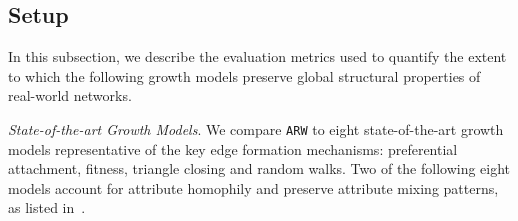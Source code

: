 \subsection{Setup}
\label{sub:Experimental Setup}

In this subsection, we describe the evaluation metrics used to quantify the extent to
which the following growth models preserve global structural properties of real-world networks.

\textit{State-of-the-art Growth Models}. We compare \texttt{ARW} to eight state-of-the-art
growth models representative of the key edge formation
mechanisms: preferential attachment, fitness, triangle closing and random walks.
Two of the following eight models account for attribute homophily and preserve attribute mixing patterns,
as listed in~.


